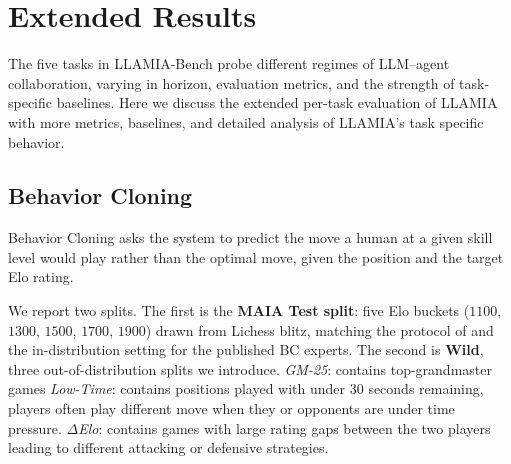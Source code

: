 \newpage
\section{Extended Results}
\label{sec:app_results}
The five tasks in LLAMIA-Bench probe different regimes of LLM–agent collaboration, varying in horizon, evaluation metrics, and the strength of task-specific baselines. Here we discuss the extended per-task evaluation of LLAMIA with more metrics, baselines, and detailed analysis of LLAMIA's task specific behavior.


\subsection{Behavior Cloning}
\label{sec:app_results_bc}
Behavior Cloning asks the system to predict the move a human at a given skill level would play rather than the optimal move, given the position and the target Elo rating.

We report two splits. The first is the \textbf{MAIA Test split}: five Elo buckets ($1100$, $1300$, $1500$, $1700$, $1900$) drawn from Lichess blitz, matching the protocol of \citet{mcilroy2022aligning} and the in-distribution setting for the published BC experts.
The second is \textbf{Wild}, three out-of-distribution splits we introduce.
 \textit{GM-25}: contains top-grandmaster games 
\textit{Low-Time}: contains positions played with under 30 seconds remaining, players often play different move when they or opponents are under time pressure. 
\textit{$\Delta$Elo}: contains games with large rating gaps between the two players leading to different attacking or defensive strategies.


